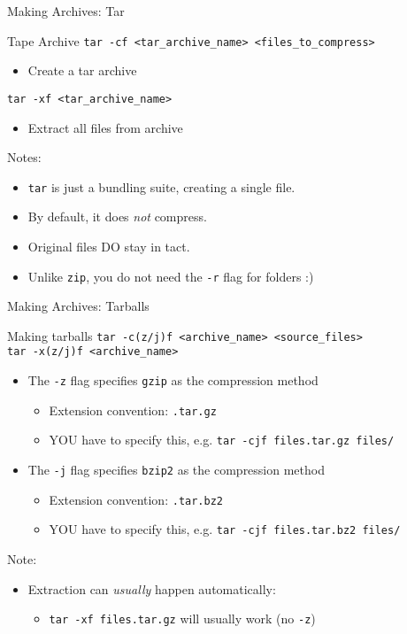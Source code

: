 \documentclass[11pt]{beamer}
\newcommand{\colbf}[1]{\textcolor{mLightBrown!77!black}{#1}}%
\begin{document}
\begin{frame}[fragile]{Making Archives: Tar}
  \begin{block}{\colbf{T}ape \colbf{Ar}chive}
    \texttt{tar -cf <tar\_archive\_name> <files\_to\_compress>}
    \begin{itemize}
      \item \colbf{C}reate a tar archive
    \end{itemize}
    \texttt{tar -xf <tar\_archive\_name>}
    \begin{itemize}
      \item E\colbf{x}tract all files from archive
    \end{itemize}
  \end{block}
  \colbf{Notes}:
  \begin{itemize}
    \item \texttt{tar} is just a bundling suite, creating a single file.
    \item By default, it does \emph{not} compress.
    \item Original files DO stay in tact.
    \item Unlike \texttt{zip}, you do not need the \texttt{-r} flag for folders :)
  \end{itemize}
\end{frame}

\begin{frame}[fragile]{Making Archives: Tarballs}
  \begin{block}{Making tarballs}
    \texttt{tar -c(z/j)f <archive\_name> <source\_files>}\\
    \texttt{tar -x(z/j)f <archive\_name>}
    \begin{itemize}
      \item The \texttt{-z} flag specifies \texttt{gzip} as the compression method
      \begin{itemize}
        \item Extension convention: \texttt{.tar.gz}
        \item YOU have to specify this, e.g. \texttt{tar -cjf files.tar.gz files/}
      \end{itemize}
      \item The \texttt{-j} flag specifies \texttt{bzip2} as the compression method
      \begin{itemize}
        \item Extension convention: \texttt{.tar.bz2}
        \item YOU have to specify this, e.g. \texttt{tar -cjf files.tar.bz2 files/}
      \end{itemize}
    \end{itemize}
  \end{block}
  \colbf{Note}:
  \begin{itemize}
    \item Extraction can \emph{usually} happen automatically:
    \begin{itemize}
      \item \texttt{tar -xf files.tar.gz} will usually work (no \texttt{-z})
    \end{itemize}
  \end{itemize}
\end{frame}
\end{document}
